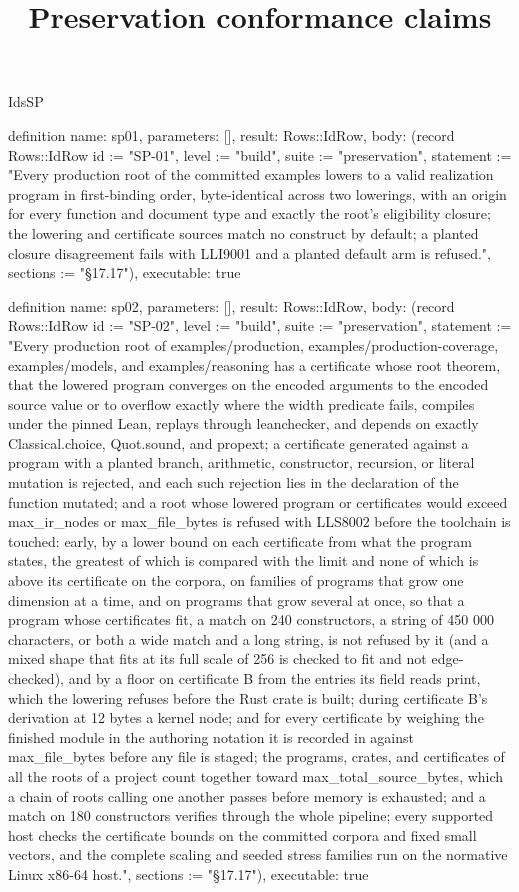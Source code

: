 \begin{lexlean}{IdsSP}
\title{Preservation conformance claims}
\begin{semanticmodule}
definition{
  name: sp01,
  parameters: [],
  result: Rows::IdRow,
  body: (record Rows::IdRow {id := "SP-01", level := "build", suite := "preservation", statement := "Every production root of the committed examples lowers to a valid realization program in first-binding order, byte-identical across two lowerings, with an origin for every function and document type and exactly the root's eligibility closure; the lowering and certificate sources match no construct by default; a planted closure disagreement fails with LLI9001 and a planted default arm is refused.", sections := "§17.17"}),
  executable: true
}

definition{
  name: sp02,
  parameters: [],
  result: Rows::IdRow,
  body: (record Rows::IdRow {id := "SP-02", level := "build", suite := "preservation", statement := "Every production root of examples/production, examples/production-coverage, examples/models, and examples/reasoning has a certificate whose root theorem, that the lowered program converges on the encoded arguments to the encoded source value or to overflow exactly where the width predicate fails, compiles under the pinned Lean, replays through leanchecker, and depends on exactly Classical.choice, Quot.sound, and propext; a certificate generated against a program with a planted branch, arithmetic, constructor, recursion, or literal mutation is rejected, and each such rejection lies in the declaration of the function mutated; and a root whose lowered program or certificates would exceed max_ir_nodes or max_file_bytes is refused with LLS8002 before the toolchain is touched: early, by a lower bound on each certificate from what the program states, the greatest of which is compared with the limit and none of which is above its certificate on the corpora, on families of programs that grow one dimension at a time, and on programs that grow several at once, so that a program whose certificates fit, a match on 240 constructors, a string of 450 000 characters, or both a wide match and a long string, is not refused by it (and a mixed shape that fits at its full scale of 256 is checked to fit and not edge-checked), and by a floor on certificate B from the entries its field reads print, which the lowering refuses before the Rust crate is built; during certificate B's derivation at 12 bytes a kernel node; and for every certificate by weighing the finished module in the authoring notation it is recorded in against max_file_bytes before any file is staged; the programs, crates, and certificates of all the roots of a project count together toward max_total_source_bytes, which a chain of roots calling one another passes before memory is exhausted; and a match on 180 constructors verifies through the whole pipeline; every supported host checks the certificate bounds on the committed corpora and fixed small vectors, and the complete scaling and seeded stress families run on the normative Linux x86-64 host.", sections := "§17.17"}),
  executable: true
}


\end{semanticmodule}
\end{lexlean}
